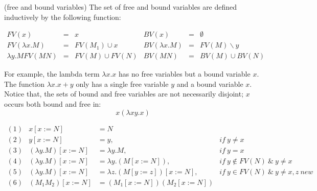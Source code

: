 \begin{def1}
\normalfont (free and bound variables) The set of free and bound variables are defined inductively by the following function:
\end{def1}

\begin{equation*}\label{eq:fv}
\begin{array}{lcllcl}
FV(x)           & = & {x}             & BV(x)           &=& \emptyset\\
FV(\lambda x.M) & = & FV(M_1)\cup {x} & BV(\lambda x.M) &=& FV(M)\backslash y\\  \lambda y.M
FV(MN)          & = & FV(M)\cup FV(N) & BV(MN)          &=& BV(M) \cup BV(N)
\end{array}
\end{equation*}


For example, the lambda term $\lambda x.x$ has no free variables but a bound variable $x$. The function $\lambda x.x+y$ only has a single free variable $y$ and a bound variable $x$. 
Notice that, the sets of bound and free variables are not necessarily disjoint; $x$ occurs both bound and free in:
\begin{equation*}
x(\lambda xy.x)
\end{equation*}

\begin{comment}
\section{Substitution}

\noindent A cursory approach to define the substitution operation leads to the problem of \textit{variable capture}. It occurs when we substitute a term containing a free variable into a scope where the variable becomes bound. For example:
\begin{equation*}
(\lambda xy.xy)y \neq \lambda y.yy
\end{equation*} 

The free occurrence of y in the left hand term becomes confused with the bound variable after substitution.To avoid \textit{variable capture}, we define a capture-avoiding susbstiution. The notion $[x:=N]$ indicates the replacement of a variable $x$ by a term $N$:
\end{comment}
\begin{equation*}
\begin{array}{lrll}
(1)&x[x:=N]&=N & ~\\
(2)&y[x:=N]&=y,& if\ y\neq x\\
(3)&(\lambda y.M)[x:=N]&=\lambda y.M,& if\ y=x\\
(4)&(\lambda y.M)[x:=N]&=\lambda y.(M[x:=N]),& if\ y\notin FV(N)\ \& \ y\neq x\\
(5)&(\lambda y.M)[x:=N]&=\lambda z.(M[y:=z])[x:=N],& if\ y\in FV(N)\ \& \ y\neq x,z\  new\\
(6)&(M_1M_2)[x:=N] &= (M_1[x:=N])(M_2[x:=N])&
\end{array}
\end{equation*}


